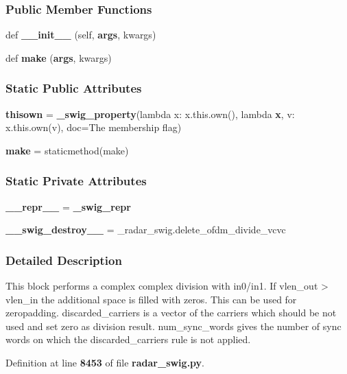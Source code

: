 \subsubsection*{Public Member Functions}
\begin{DoxyCompactItemize}
\item 
def {\bf \+\_\+\+\_\+init\+\_\+\+\_\+} (self, {\bf args}, kwargs)
\item 
def {\bf make} ({\bf args}, kwargs)
\end{DoxyCompactItemize}
\subsubsection*{Static Public Attributes}
\begin{DoxyCompactItemize}
\item 
{\bf thisown} = {\bf \+\_\+swig\+\_\+property}(lambda x\+: x.\+this.\+own(), lambda {\bf x}, v\+: x.\+this.\+own(v), doc=\textquotesingle{}The membership flag\textquotesingle{})
\item 
{\bf make} = staticmethod(make)
\end{DoxyCompactItemize}
\subsubsection*{Static Private Attributes}
\begin{DoxyCompactItemize}
\item 
{\bf \+\_\+\+\_\+repr\+\_\+\+\_\+} = {\bf \+\_\+swig\+\_\+repr}
\item 
{\bf \+\_\+\+\_\+swig\+\_\+destroy\+\_\+\+\_\+} = \+\_\+radar\+\_\+swig.\+delete\+\_\+ofdm\+\_\+divide\+\_\+vcvc
\end{DoxyCompactItemize}


\subsubsection{Detailed Description}
\begin{DoxyVerb}This block performs a complex complex division with in0/in1. If vlen_out > vlen_in the additional space is filled with zeros. This can be used for zeropadding. discarded_carriers is a vector of the carriers which should be not used and set zero as division result. num_sync_words gives the number of sync words on which the discarded_carriers rule is not applied.\end{DoxyVerb}
 

Definition at line {\bf 8453} of file {\bf radar\+\_\+swig.\+py}.



